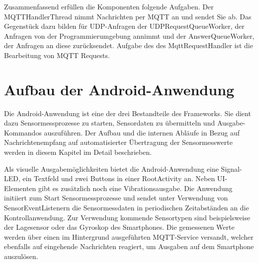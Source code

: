 \documentclass[11pt,a4paper]{report}
\begin{document}
Zusammenfassend erfüllen die Komponenten folgende Aufgaben.
Der MQTTHandlerThread nimmt Nachrichten per MQTT an und sendet Sie ab.
Das Gegenstück dazu bilden für UDP-Anfragen der UDPRequestQueueWorker, der Anfragen von der Programmierumgebung annimmt und der AnswerQueueWorker, der Anfragen an diese zurücksendet.
Aufgabe des des MqttRequestHandler ist die Bearbeitung von MQTT Requests.

\chapter{Aufbau der Android-Anwendung}\label{chap:app}
Die Android-Anwendung ist eine der drei Bestandteile des Frameworks.
Sie dient dazu Sensormessprozesse zu starten, Sensordaten zu übermitteln und Ausgabe-Kommandos auszuführen.
Der Aufbau und die internen Abläufe in Bezug auf Nachrichtenempfang auf automatisierter Übertragung der Sensormesswerte werden in diesem Kapitel im Detail beschrieben.

Als visuelle Ausgabemöglichkeiten bietet die Android-Anwendung eine Signal-LED, ein Textfeld und zwei Buttons in einer RootActivity an.
Neben UI-Elementen gibt es zusätzlich noch eine Vibrationsausgabe. 
Die Anwendung initiiert zum Start Sensormessprozesse und sendet unter Verwendung von SensorEventListenern die Sensormessdaten in periodischen Zeitabständen an die Kontrollanwendung.
Zur Verwendung kommende Sensortypen sind beispielsweise der Lagesensor oder das Gyroskop des Smartphones.
Die gemessenen Werte werden über einen im Hintergrund ausgeführten MQTT-Service versandt, welcher ebenfalls auf eingehende Nachrichten reagiert, um Ausgaben auf dem Smartphone auszulösen.
\end{document}
